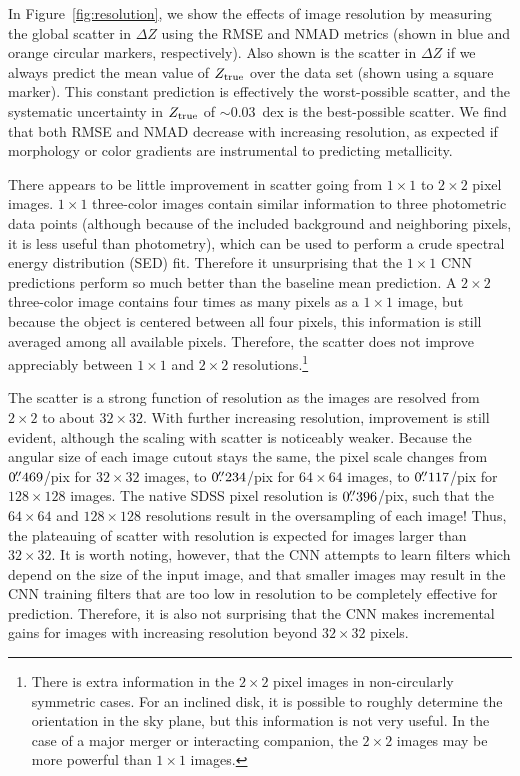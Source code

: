\documentclass[fleqn,usenatbib]{mnras}
\begin{document}
In Figure~\ref{fig:resolution}, we show the effects of image resolution by measuring the global scatter in $\Delta Z$ using the RMSE and NMAD metrics (shown in blue and orange circular markers, respectively). Also shown is the scatter in $\Delta Z$ if we always predict the mean value of $Z_{\rm true}$ over the data set (shown using a square marker). This constant prediction is effectively the worst-possible scatter, and the \cite{Tremonti2004} systematic uncertainty in $Z_{\rm true}$ of $\sim 0.03$~dex is the best-possible scatter. We find that both RMSE and NMAD decrease with increasing resolution, as expected if morphology or color gradients are instrumental to predicting metallicity.

There appears to be little improvement in scatter going from $1 \times 1$ to $2\times 2$ pixel images. $1\times 1$ three-color images contain similar information to three photometric data points (although because of the included background and neighboring pixels, it is less useful than photometry), which can be used to perform a crude spectral energy distribution (SED) fit.
Therefore it unsurprising that the $1 \times 1$ CNN predictions perform so much better than the baseline mean prediction. A $2 \times 2$ three-color image contains four times as many pixels as a $1\times 1$ image, but because the object is centered between all four pixels, this information is still averaged among all available pixels. Therefore, the scatter does not improve appreciably between $1 \times 1$ and $2 \times 2$ resolutions.\footnote{There is extra information in the $2\times 2$ pixel images in non-circularly symmetric cases. For an inclined disk, it is possible to roughly determine the orientation in the sky plane, but this information is not very useful. In the case of a major merger or interacting companion, the $2\times 2$ images may be more powerful than $1 \times 1$ images.}

The scatter is a strong function of resolution as the images are resolved from $2 \times 2$ to about $32 \times 32$. With further increasing resolution, improvement is still evident, although the scaling with scatter is noticeably weaker. Because the angular size of each image cutout stays the same, the pixel scale changes from $0\hbox{$.\!\!^{\prime\prime}$}469$/pix for $32 \times 32$ images, to $0\hbox{$.\!\!^{\prime\prime}$}234$/pix for $64 \times 64$ images, to $0\hbox{$.\!\!^{\prime\prime}$}117$/pix for $128 \times 128$ images. The native SDSS pixel resolution is $0\hbox{$.\!\!^{\prime\prime}$}396$/pix, such that the $64 \times 64$ and $128 \times 128$ resolutions result in the oversampling of each image! Thus, the plateauing of scatter with resolution is expected for images larger than $32 \times 32$. It is worth noting, however, that the CNN attempts to learn filters which depend on the size of the input image, and that smaller images may result in the CNN training filters that are too low in resolution to be completely effective for prediction. Therefore, it is also not surprising that the CNN makes incremental gains for images with increasing resolution beyond $32 \times 32$ pixels.
\end{document}

